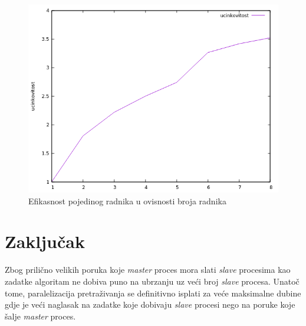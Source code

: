 \documentclass[12pt]{article}
\begin{document}
\begin{figure}[h]
\begin{center}
\includegraphics[width=15cm]{efficiency_graph}
\caption{Efikasnost pojedinog radnika u ovisnosti broja radnika}
\label{efficiency_graph}
\end{center}
\end{figure}

\section{Zaključak}
Zbog prilično velikih poruka koje \textit{master} proces mora slati \textit{slave} procesima
kao zadatke algoritam ne dobiva puno na ubrzanju uz veći broj \textit{slave} procesa.
Unatoč tome, paralelizacija pretraživanja se definitivno isplati za veće maksimalne dubine
gdje je veći naglasak na zadatke koje dobivaju \textit{slave} procesi nego
na poruke koje šalje \textit{master} proces.
\end{document}
